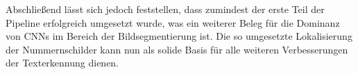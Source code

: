 Abschlie{\ss}end l\"asst sich jedoch feststellen, dass zumindest der erste Teil der
Pipeline erfolgreich umgesetzt wurde, was ein weiterer Beleg f\"ur die
Dominanz von CNNs im Bereich der Bildsegmentierung ist.
Die so umgesetzte Lokalisierung der Nummernschilder kann nun als solide Basis f\"ur
alle weiteren Verbesserungen der Texterkennung dienen.
